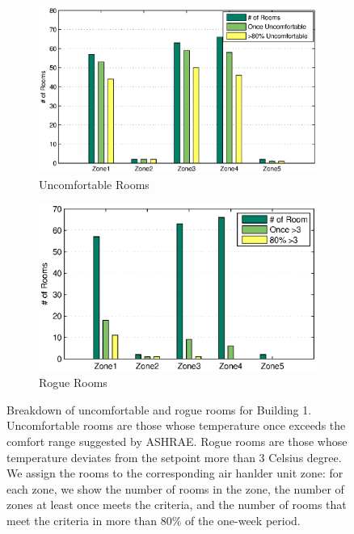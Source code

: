 \begin{figure}[h!]
\centering
	\begin{subfigure}{0.48\textwidth}
                \centering
		\includegraphics[width=\textwidth]{./figs/uncmft_soda.eps}
                \caption{Uncomfortable Rooms}
                \label{fig:soda_zone1}
	\end{subfigure}
	\begin{subfigure}{0.48\textwidth}
                \centering
		\includegraphics[width=\textwidth]{./figs/rogue_soda.eps}
                \caption{Rogue Rooms}
                \label{fig:soda_zone2}

	\end{subfigure}
\caption{Breakdown of uncomfortable and rogue rooms for Building 1. Uncomfortable rooms are those whose temperature once exceeds the comfort range suggested by ASHRAE. Rogue rooms are those whose temperature deviates from the setpoint more than 3 Celsius degree. We assign the rooms to the corresponding air hanlder unit zone: for each zone, we show the number of rooms in the zone, the number of zones at least once meets the criteria, and the number of rooms that meet the criteria in more than 80\% of the one-week period.} 
\end{figure}

